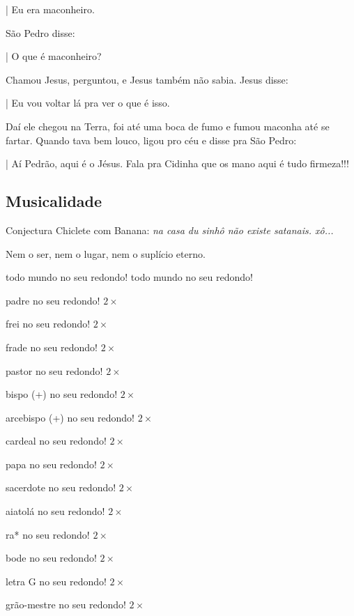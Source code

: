 \documentclass[12pt,a4paper]{article}
\begin{document}
| Eu era maconheiro.

S\~ao Pedro disse:

| O que \'e maconheiro?

Chamou Jesus, perguntou, e Jesus tamb\'em n\~ao sabia. Jesus disse:

| Eu vou voltar l\'a pra ver o que \'e isso.

Da\'i ele chegou na Terra, foi at\'e uma boca de fumo e fumou maconha at\'e se fartar. Quando tava bem louco, ligou pro c\'eu e disse pra S\~ao Pedro:

| A\'i Pedr\~ao, aqui \'e o J\'esus. Fala pra Cidinha que os mano aqui \'e tudo firmeza!!!

		\subsection{Musicalidade}
			\begin{flushright}
			\end{flushright}

			Conjectura Chiclete com Banana: \emph{na casa du sinh\^o n\~ao existe satanais. x\^o...}

			Nem o ser, nem o lugar, nem o supl\'icio eterno.

			\begin{flushright}
			\end{flushright}

			todo mundo no seu redondo! todo mundo no seu redondo!

			padre no seu redondo! $2\times$

			frei no seu redondo! $2\times$

			frade no seu redondo! $2\times$

			pastor no seu redondo! $2\times$

			bispo (+) no seu redondo! $2\times$

			arcebispo (+) no seu redondo! $2\times$

			cardeal no seu redondo! $2\times$

			papa no seu redondo! $2\times$

			sacerdote no seu redondo! $2\times$

			aiatol\'a no seu redondo! $2\times$

			ra* no seu redondo! $2\times$

			bode no seu redondo! $2\times$

			letra G no seu redondo! $2\times$

			gr\~ao-mestre no seu redondo! $2\times$
\end{document}
